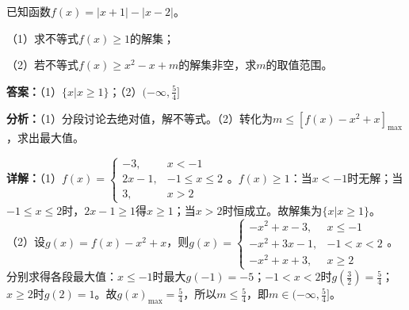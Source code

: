 \begin{question}[points=10]
[选修4-5：不等式选讲]

已知函数$f(x)=|x+1|-|x-2|$。

（1）求不等式$f(x)\ge 1$的解集；

（2）若不等式$f(x)\ge x^2-x+m$的解集非空，求$m$的取值范围。
\begin{solution}
\textbf{答案：}（1）$\{x|x\ge 1\}$；（2）$(-\infty,\frac{5}{4}]$

\textbf{分析：}（1）分段讨论去绝对值，解不等式。（2）转化为$m\le [f(x)-x^2+x]_{\max}$，求出最大值。

\textbf{详解：}（1）$f(x)=\begin{cases} -3,&x<-1\\ 2x-1,&-1\le x\le 2\\ 3,&x>2 \end{cases}$。$f(x)\ge 1$：当$x<-1$时无解；当$-1\le x\le 2$时，$2x-1\ge 1$得$x\ge 1$；当$x>2$时恒成立。故解集为$\{x|x\ge 1\}$。
（2）设$g(x)=f(x)-x^2+x$，则$g(x)=\begin{cases} -x^2+x-3,&x\le -1\\ -x^2+3x-1,&-1<x<2\\ -x^2+x+3,&x\ge 2 \end{cases}$。分别求得各段最大值：$x\le -1$时最大$g(-1)=-5$；$-1<x<2$时$g(\frac{3}{2})=\frac{5}{4}$；$x\ge 2$时$g(2)=1$。故$g(x)_{\max}=\frac{5}{4}$，所以$m\le \frac{5}{4}$，即$m\in(-\infty,\frac{5}{4}]$。
\end{solution}
\end{question}

